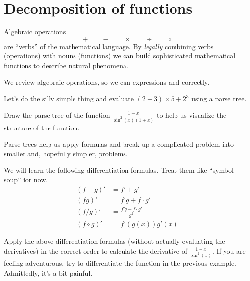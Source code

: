 \documentclass[../main.tex]{subfiles}
\begin{document}
 \section{Decomposition of functions}
Algebraic operations \[+ \qquad - \qquad \times \qquad \div \qquad \circ\] are ``verbs'' of the mathematical language. By \emph{legally} combining verbs (operations) with nouns (functions) we can build sophisticated mathematical functions to describe natural phenomena.

We review algebraic operations, so we can  expressions and  correctly.



\begin{example}
  Let's do the silly simple thing and evaluate \((2 + 3) \times 5 + 2^{3}\) using a parse tree.

\end{example}

\begin{example}
  Draw the parse tree of the function \(\frac{1 - x}{\sin^{2}(x) (1+x)}\) to help us visualize the structure of the function.

\end{example}
\clearpage

Parse trees help us apply formulas  and break up a complicated problem into smaller and, hopefully simpler, problems.

We will learn the following differentiation formulas.  Treat them like ``symbol soup'' for now.
\begin{align*}
  (f+g)' &= f' + g' \\
  (fg)' &= f'g + f \cdot g' \\
  (f/g)' &= \frac{f'g - f \cdot g'}{g^{2}} \\
  (f \circ g)' &= f'(g(x)) g'(x)
\end{align*}

\begin{example}
  Apply the above differentiation formulas (without actually evaluating the derivatives) in the correct order to calculate the derivative of \(\frac{1-x}{\sin^{2}(x)}\).  \newline
  {\scriptsize If you are feeling adventurous, try to differentiate the function in the previous example. Admittedly, it's a bit painful.}

\end{example}
\end{document}
